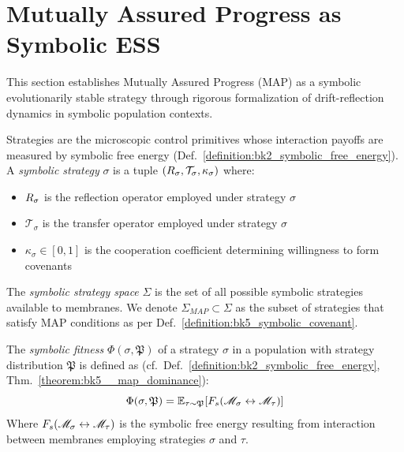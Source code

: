 \section{Mutually Assured Progress as Symbolic ESS}
\label{sec:bk5_mutually_assured_progress_as_symbolic_ess}
This section establishes Mutually Assured Progress (MAP) as a symbolic evolutionarily stable strategy through rigorous formalization of drift-reflection dynamics in symbolic population contexts.
\begin{definition}
\label{definition:bk5_symbolic_strategy}
Strategies are the microscopic control primitives whose interaction payoffs are measured by symbolic free energy (Def.~\ref{definition:bk2_symbolic_free_energy}).
A \emph{symbolic strategy} $\sigma$ is a tuple $(R_\sigma, \mathcal{T}_\sigma, \kappa_\sigma)$ where:
\begin{itemize}
    \item $R_\sigma$ is the reflection operator employed under strategy $\sigma$
    \item $\mathcal{T}_\sigma$ is the transfer operator employed under strategy $\sigma$
    \item $\kappa_\sigma \in [0,1]$ is the cooperation coefficient determining willingness to form covenants
\end{itemize}
\end{definition}
\begin{definition}
\label{definition:bk5_strategy_space}
The \emph{symbolic strategy space} $\Sigma$ is the set of all possible symbolic strategies available to membranes. We denote $\Sigma_{MAP} \subset \Sigma$ as the subset of strategies that satisfy MAP conditions as per Def.~\ref{definition:bk5_symbolic_covenant}.
\end{definition}
\begin{definition}
\label{definition:bk5_symbolic_fitness}
The \emph{symbolic fitness} $\Phi(\sigma, \mathfrak{P})$ of a strategy $\sigma$ in a population with strategy distribution $\mathfrak{P}$ is defined as (cf.~Def.~\ref{definition:bk2_symbolic_free_energy}, Thm.~\ref{theorem:bk5__map_dominance}):
\begin{equation}
\Phi(\sigma, \mathfrak{P}) = \mathbb{E}_{\tau \sim \mathfrak{P}}[F_s(\mathscr{M}_\sigma \leftrightarrow \mathscr{M}_\tau)]
\end{equation}
Where $F_s(\mathscr{M}_\sigma \leftrightarrow \mathscr{M}_\tau)$ is the symbolic free energy resulting from interaction between membranes employing strategies $\sigma$ and $\tau$.
\end{definition}
